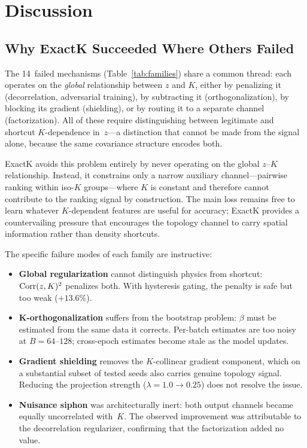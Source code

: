 
\section{Discussion}

\subsection{Why ExactK Succeeded Where Others Failed}

The 14~failed mechanisms (Table~\ref{tab:families}) share a common thread: each operates on the \emph{global} relationship between $z$ and $K$, either by penalizing it (decorrelation, adversarial training), by subtracting it (orthogonalization), by blocking its gradient (shielding), or by routing it to a separate channel (factorization). All of these require distinguishing between legitimate and shortcut $K$-dependence in~$z$---a distinction that cannot be made from the signal alone, because the same covariance structure encodes both.

ExactK avoids this problem entirely by never operating on the global $z$--$K$ relationship. Instead, it constrains only a narrow auxiliary channel---pairwise ranking within iso-$K$ groups---where $K$ is constant and therefore cannot contribute to the ranking signal by construction. The main loss remains free to learn whatever $K$-dependent features are useful for accuracy; ExactK provides a countervailing pressure that encourages the topology channel to carry spatial information rather than density shortcuts.

The specific failure modes of each family are instructive:
\begin{itemize}
\item \textbf{Global regularization} cannot distinguish physics from shortcut: $\mathrm{Corr}(z, K)^2$ penalizes both. With hysteresis gating, the penalty is safe but too weak ($+13.6\%$).
\item \textbf{K-orthogonalization} suffers from the bootstrap problem: $\beta$ must be estimated from the same data it corrects. Per-batch estimates are too noisy at $B{=}64$--$128$; cross-epoch estimates become stale as the model updates.
\item \textbf{Gradient shielding} removes the $K$-collinear gradient component, which on a substantial subset of tested seeds also carries genuine topology signal. Reducing the projection strength ($\lambda{=}1.0 \to 0.25$) does not resolve the issue.
\item \textbf{Nuisance siphon} was architecturally inert: both output channels became equally uncorrelated with~$K$. The observed improvement was attributable to the decorrelation regularizer, confirming that the factorization added no value.
\end{itemize}


